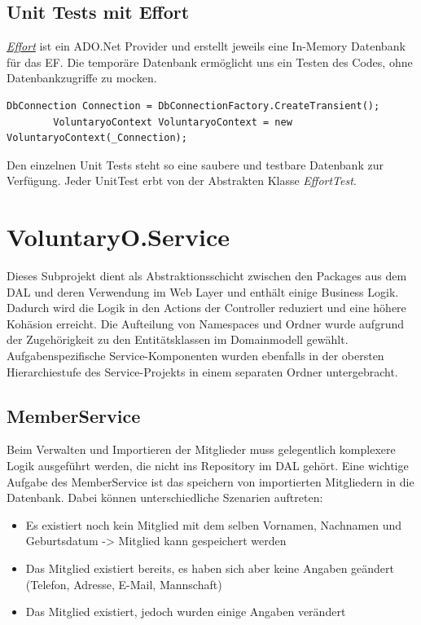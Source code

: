 	\subsection{Unit Tests mit Effort}
	\href{https://effort.codeplex.com/}{\textit{Effort}} ist ein ADO.Net Provider und erstellt jeweils eine In-Memory Datenbank für das EF. Die temporäre Datenbank ermöglicht uns ein Testen des Codes, ohne Datenbankzugriffe zu mocken.
	\begin{lstlisting}[language=CSharp, caption=Verwendung Effort für Unit Tests in EffortTest.cs, label=lst:effortunittest, firstnumber=1]
		DbConnection Connection = DbConnectionFactory.CreateTransient();
		VoluntaryoContext VoluntaryoContext = new VoluntaryoContext(_Connection);
    \end{lstlisting}
    Den einzelnen Unit Tests steht so eine saubere und testbare Datenbank zur Verfügung. Jeder UnitTest erbt von der Abstrakten Klasse \textit{EffortTest}.

\newpage
\section{VoluntaryO.Service}
Dieses Subprojekt dient als Abstraktionsschicht zwischen den Packages aus dem DAL und deren Verwendung im Web Layer und enthält einige Business Logik. Dadurch wird die Logik in den Actions der Controller reduziert und eine höhere Kohäsion erreicht. Die Aufteilung  von Namespaces und Ordner wurde aufgrund der Zugehörigkeit zu den Entitätsklassen im Domainmodell gewählt. Aufgabenspezifische Service-Komponenten wurden ebenfalls in der obersten Hierarchiestufe des Service-Projekts in einem separaten Ordner untergebracht.
	
	
	\subsection{MemberService}	
	Beim Verwalten und Importieren der Mitglieder muss gelegentlich komplexere Logik ausgeführt werden, die nicht ins Repository im DAL gehört.
	Eine wichtige Aufgabe des MemberService ist das speichern von importierten Mitgliedern in die Datenbank. Dabei können unterschiedliche Szenarien auftreten:
	\\\begin{itemize}	
		\item Es existiert noch kein Mitglied mit dem selben Vornamen, Nachnamen und Geburtsdatum -> Mitglied kann gespeichert werden
		\item Das Mitglied existiert bereits, es haben sich aber keine Angaben geändert (Telefon, Adresse, E-Mail, Mannschaft)
		\item Das Mitglied existiert, jedoch wurden einige Angaben verändert\\
	\end{itemize}
	
